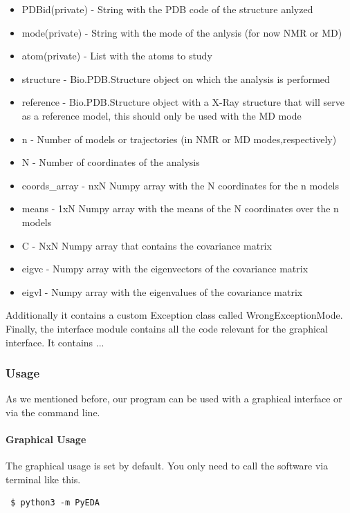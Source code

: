 \documentclass[12pt]{article}
\begin{document}
\begin{itemize}
        \item PDBid(private) - String with the PDB code of the structure anlyzed
        \item mode(private) - String with the mode of the anlysis (for now NMR or MD)
        \item atom(private) - List with the atoms to study
        \item structure - Bio.PDB.Structure object on which the analysis is performed
        \item reference - Bio.PDB.Structure object with a X-Ray structure
                that will serve as a reference model, this should only be used
                with the MD mode
        \item n - Number of models or trajectories (in NMR or MD modes,respectively)
        \item N - Number of coordinates of the analysis
       \item coords\_array - nxN Numpy array with the N coordinates for the n models
       \item means - 1xN Numpy array with the means of the N coordinates over the n
            models
	\item  C - NxN Numpy array that contains the covariance matrix
       \item eigvc - Numpy array with the eigenvectors of the covariance matrix
       \item eigvl - Numpy array with the eigenvalues of the covariance matrix
\end{itemize}

Additionally it contains a custom Exception class called WrongExceptionMode.\\

Finally, the interface module contains all the code relevant for the graphical interface. It contains ...\\
\subsubsection{Usage}

As we mentioned before, our program can be used with a graphical interface or via the command line.

 \paragraph{Graphical Usage}
 The graphical usage is set by default. You only need to call the software via terminal like this. 
\begin{lstlisting}
 $ python3 -m PyEDA
 \end{lstlisting}
 
\end{document}
